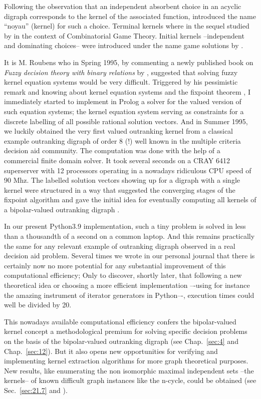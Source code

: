 Following the observation that an independent absorbent choice in an acyclic digraph corresponds to the kernel of the associated \Grundy function, \citet{RIG-1948} introduced the name ``noyau'' (kernel) for such a choice. Terminal kernels where in the sequel studied by \citet{BER-1958} in the context of Combinatorial Game Theory. Initial kernels --independent and dominating choices-- were introduced under the name game solutions by \citet{NEU-1944}.

It is M. Roubens who in Spring 1995, by commenting a newly published book on \emph{Fuzzy decision theory with binary relations} by \cite{KIT-1993}, suggested that solving fuzzy kernel equation systems would be very difficult. Triggered by his pessimistic remark and knowing about kernel equation systems and the \Neumann fixpoint theorem \citep{NEU-1944,SCH-1985}, I immediately started to implement in Prolog a solver for the valued version of such equation systems; the kernel equation system serving as constraints for a discrete labelling of all possible rational solution vectors. And in Summer 1995, we luckily obtained the very first valued outranking kernel from a classical example outranking digraph of order 8 (!) well known in the multiple criteria decision aid community. The computation was done with the help of a commercial finite domain solver. It took several seconds on a CRAY 6412 superserver with 12 processors operating in a nowadays ridiculous CPU speed of 90 Mhz. The labelled solution vectors showing up for a digraph with a single kernel were structured in a way that suggested the converging stages of the \Neumann fixpoint algorithm and gave the initial idea for eventually computing all kernels of a bipolar-valued outranking digraph \citep*{BIS-1996,BIS-1997,BIS-2004d}. 

In our present Python3.9 implementation, such a tiny problem is solved in less than a thousandth of a second on a common laptop. And this remains practically the same for any relevant example of outranking digraph observed in a real decision aid problem. Several times we wrote in our personal journal that there is certainly now no more potential for any substantial improvement of this computational efficiency; Only to discover, shortly later, that following a new theoretical idea or choosing a more efficient implementation –-using for instance the amazing instrument of iterator generators in Python–-, execution times could well be divided by 20.

This nowadays available computational efficiency confers the bipolar-valued kernel concept a methodological premium for solving specific decision problems on the basis of the bipolar-valued outranking digraph (see Chap.~\ref{sec:4} and Chap.~\ref{sec:12}). But it also opens new opportunities for verifying and implementing kernel extraction algorithms for more graph theoretical purposes. New results, like enumerating the non isomorphic maximal independent sets --the kernels-- of known difficult graph instances like the n-cycle, could be obtained (see Sec.~\ref{sec:21.7} and \citealp*{ISO-2008}).

\clearpage
%


